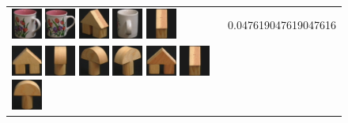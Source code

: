 {\begin{figure}[p]
\begin{tabular}{m{11cm} | m{3cm} |}
\includegraphics[width=1cm]{coil/beeld-10.eps}
\includegraphics[width=1cm]{coil/beeld-6.eps}
\includegraphics[width=1cm]{coil/beeld-46.eps}
\includegraphics[width=1cm]{coil/beeld-41.eps}
\includegraphics[width=1cm]{coil/beeld-47.eps}
& {\scriptsize 0.047619047619047616}
\\
\includegraphics[width=1cm]{coil/beeld-42.eps}
\includegraphics[width=1cm]{coil/beeld-5.eps}
\includegraphics[width=1cm]{coil/beeld-4.eps}
\includegraphics[width=1cm]{coil/beeld-3.eps}
\includegraphics[width=1cm]{coil/beeld-43.eps}
\includegraphics[width=1cm]{coil/beeld-47.eps}
\includegraphics[width=1cm]{coil/beeld-1.eps}

\end{tabular}
\end{figure}}
